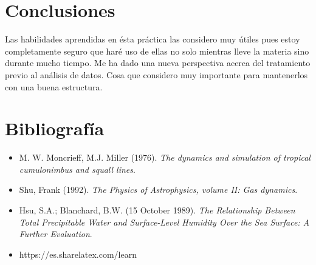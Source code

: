 \documentclass{article}
\begin{document}
\section{Conclusiones}
Las habilidades aprendidas en ésta práctica las considero muy útiles pues estoy completamente seguro que haré uso de ellas no solo mientras lleve la materia sino durante mucho tiempo. Me ha dado una nueva perspectiva acerca del tratamiento previo al análisis de datos. Cosa que considero muy importante para mantenerlos con una buena estructura.\\
\section{Bibliografía}
\begin{itemize}
\item M. W. Moncrieff, M.J. Miller (1976). \textit{The dynamics and simulation of tropical cumulonimbus and squall lines}.
\item Shu, Frank (1992). \textit{The Physics of Astrophysics, volume II: Gas dynamics}. 
\item  Hsu, S.A.; Blanchard, B.W. (15 October 1989). \textit{The Relationship Between Total Precipitable Water and Surface-Level Humidity Over the Sea Surface: A Further Evaluation}.
\item https://es.sharelatex.com/learn
\end{itemize}
\end{document}
